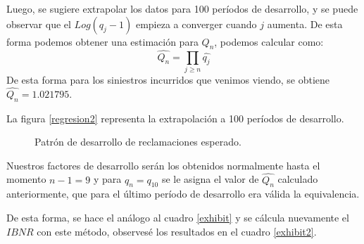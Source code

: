 \documentclass[
  12pt,
]{article}
\begin{document}
Luego, se sugiere extrapolar los datos para 100 períodos de desarrollo,
y se puede observar que el \(Log(q_j -1)\) empieza a converger cuando
\(j\) aumenta. De esta forma podemos obtener una estimación para
\(Q_n\), podemos calcular como:
\[\hat{Q_n} = \prod_{j\geq n} \hat{q_{j}} \] De esta forma para los
siniestros incurridos que venimos viendo, se obtiene
\(\hat{Q_n} = 1.021795\).

La figura \ref{regresion2} representa la extrapolación a 100 períodos de
desarrollo.

\begin{figure}
\caption{\label{regresion2} Patrón de desarrollo de reclamaciones esperado.}\label{fig:unnamed-chunk-10}
\end{figure}

Nuestros factores de desarrollo serán los obtenidos normalmente hasta el
momento \(n-1=9\) y para \(q_n=q_{10}\) se le asigna el valor de
\(\hat{Q_n}\) calculado anteriormente, que para el último período de
desarrollo era válida la equivalencia.

De esta forma, se hace el análogo al cuadro \ref{exhibit} y se cálcula
nuevamente el \(IBNR\) con este método, observesé los resultados en el
cuadro \ref{exhibit2}.
\end{document}
